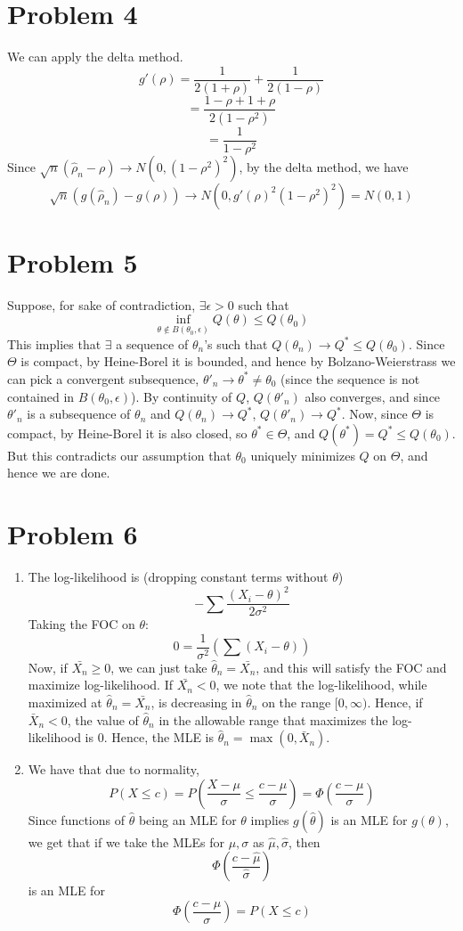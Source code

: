 \documentclass[10pt,letter]{article}
\begin{document}
\section*{Problem 4}
We can apply the delta method.
\[ g'(\rho) = \frac{1}{2(1+\rho)} + \frac{1}{2(1-\rho)} \]
\[ = \frac{1-\rho + 1+\rho}{2(1-\rho^2)} \]
\[ = \frac{1}{1-\rho^2} \]
Since $\sqrt{n} (\hat{\rho}_n - \rho) \to N(0, (1-\rho^2)^2)$, by the delta method, we have
\[\sqrt{n} (g(\hat{\rho}_n) - g(\rho)) \to N(0, g'(\rho)^2(1-\rho^2)^2) = N(0,1)  \]
\section*{Problem 5}
Suppose, for sake of contradiction, $\exists \epsilon > 0$ such that
\[ \inf_{\theta \not \in B(\theta_0, \epsilon)}Q(\theta) \le Q(\theta_0) \]
This implies that $\exists$ a sequence of $\theta_n$'s such that $Q(\theta_n) \to Q^* \le Q(\theta_0)$. Since $\Theta$ is compact, by Heine-Borel it is bounded, and hence by Bolzano-Weierstrass we can pick a convergent subsequence, $\theta'_n \to \theta^* \neq \theta_0$ (since the sequence is not contained in $B(\theta_0, \epsilon)$). By continuity of $Q$, $Q(\theta'_n)$ also converges, and since $\theta'_n$ is a subsequence of $\theta_n$ and $Q(\theta_n) \to Q^*$, $Q(\theta'_n) \to Q^*$. Now, since $\Theta$ is compact, by Heine-Borel it is also closed, so $\theta^* \in \Theta$, and $Q(\theta^*) = Q^* \le Q(\theta_0)$. But this contradicts our assumption that $\theta_0$ uniquely minimizes $Q$ on $\Theta$, and hence we are done.
\section*{Problem 6}
\begin{enumerate}[label=(\alph*)]
\item The log-likelihood is (dropping constant terms without $\theta$)
\[ - \sum \frac{(X_i - \theta)^2}{2\sigma^2} \]
Taking the FOC on $\theta$:
\[ 0 = \frac{1}{\sigma^2} \left( \sum (X_i - \theta) \right) \]
Now, if $\bar{X_n} \ge 0$, we can just take $\hat{\theta}_n = \bar{X_n}$, and this will satisfy the FOC and maximize log-likelihood. If $\bar{X_n} < 0$, we note that the log-likelihood, while maximized at $\hat{\theta}_n = \bar{X_n}$, is decreasing in $\hat{\theta}_n$ on the range $[0, \infty)$. Hence, if $\bar{X}_n < 0$, the value of $\hat{\theta}_n$ in the allowable range that maximizes the log-likelihood is 0. Hence, the MLE is $\hat{\theta}_n= \max (0, \bar{X}_n)$.
\item We have that due to normality,
\[ P(X \le c) = P\left( \frac{X - \mu}{\sigma} \le \frac{c-\mu}{\sigma}\right) = \Phi\left( \frac{c-\mu}{\sigma}\right) \]
Since functions of $\hat{\theta}$ being an MLE for $\theta$ implies $g(\hat{\theta})$ is an MLE for $g(\theta)$, we get that if we take the MLEs for $\mu, \sigma$ as $\hat{\mu}, \hat{\sigma}$, then
\[ \Phi\left(\frac{c - \hat{\mu}}{\hat{\sigma}}\right) \]
is an MLE for
\[  \Phi\left( \frac{c-\mu}{\sigma}\right) = P(X \le c)  \]
\end{enumerate}
\end{document}
